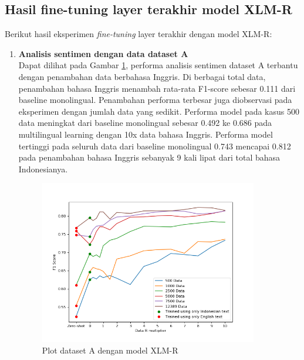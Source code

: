     \subsection{Hasil fine-tuning layer terakhir model XLM-R}
        Berikut hasil eksperimen \textit{fine-tuning} layer terakhir dengan model XLM-R: 
        \begin{enumerate}
            \item \textbf{Analisis sentimen dengan data dataset A} \\
            Dapat dilihat pada Gambar \ref{fig:plot_head_trip_xlmr}, performa analisis sentimen dataset A terbantu dengan penambahan data berbahasa Inggris. Di berbagai total data, penambahan bahasa Inggris menambah rata-rata F1-score sebesar 0.111 dari baseline monolingual. Penambahan performa terbesar juga diobservasi pada eksperimen dengan jumlah data yang sedikit. Performa model pada kasus 500 data meningkat dari baseline monolingual sebesar 0.492 ke 0.686 pada multilingual learning dengan 10x data bahasa Inggris. Performa model tertinggi pada seluruh data dari baseline monolingual 0.743 mencapai 0.812 pada penambahan bahasa Inggris sebanyak 9 kali lipat dari total bahasa Indonesianya.
             
            \begin{figure}[ht]
                \centering
                \includegraphics[width=0.9\textwidth]{resources/plot-head-trip-xlmr.png}
                \caption{Plot dataset A dengan model XLM-R}
                \label{fig:plot_head_trip_xlmr}
            \end{figure}
            


\end{enumerate}
